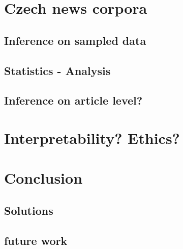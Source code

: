 \chapter{Czech news corpora}
\section{Inference on sampled data}
\section{Statistics - Analysis}
\section{Inference on article level?}

\chapter{Interpretability? Ethics?}
\chapter{Conclusion}
\section{Solutions}
\section{future work}